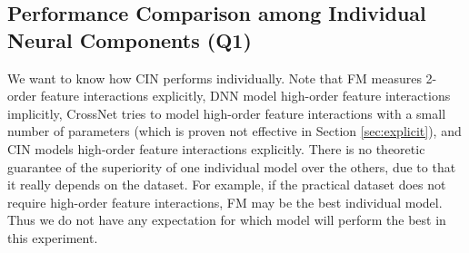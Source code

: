    \begin{table*}[th]
    \centering
    \caption{Overall performance of different models on Criteo, Dianping and Bing News datasets. The column \textsl{Depth} presents the best setting for network depth with a format of (cross layers, DNN layers).}
     {}
     \label{tab:overallperformance} 
\end{table*}
\subsection{Performance Comparison among Individual Neural Components (Q1)}
We want to know how CIN performs individually. Note that FM measures 2-order feature interactions explicitly, DNN model high-order feature interactions implicitly, CrossNet tries to model high-order feature interactions with a small number of parameters (which is proven not effective in Section \ref{sec:explicit}), and CIN models high-order feature interactions explicitly. There is no theoretic guarantee of the superiority of one individual model over the others, due to that it really depends on the dataset. For example, if the practical dataset does not require high-order feature interactions, FM may be the best individual model. Thus we do not have any expectation for which model will perform the best in this experiment. 
 
